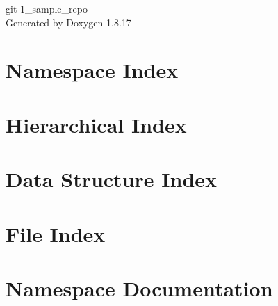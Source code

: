 \let\mypdfximage\pdfximage\def\pdfximage{\immediate\mypdfximage}\documentclass[twoside]{book}
\newcommand{\+}{\discretionary{\mbox{\scriptsize$\hookleftarrow$}}{}{}}
\newcommand{\clearemptydoublepage}{%
  \newpage{\pagestyle{empty}\cleardoublepage}%
}
\begin{document}
\hypersetup{pageanchor=false,
             bookmarksnumbered=true,
             pdfencoding=unicode
            }
\begin{titlepage}
\vspace*{7cm}
\begin{center}%
{\Large git-\/1\+\_\+sample\+\_\+repo }\\
\vspace*{1cm}
{\large Generated by Doxygen 1.8.17}\\
\end{center}
\end{titlepage}
\clearemptydoublepage
{}
\tableofcontents
\clearemptydoublepage
{}
\hypersetup{pageanchor=true}

\chapter{Namespace Index}

\chapter{Hierarchical Index}

\chapter{Data Structure Index}

\chapter{File Index}

\chapter{Namespace Documentation}












\end{document}
